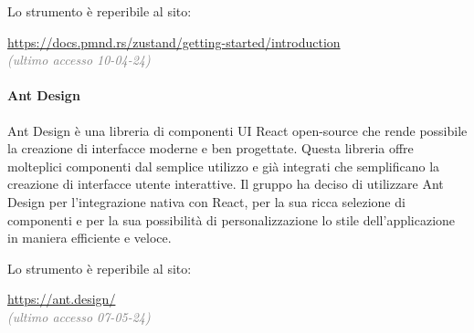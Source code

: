 \noindent Lo strumento è reperibile al sito:
\begin{center}
    \url{https://docs.pmnd.rs/zustand/getting-started/introduction}\\ \textcolor{gray}{\textit{(ultimo accesso 10-04-24)}}
\end{center}

\paragraph{Ant Design} \label{sec:processi_primari:sviluppo:strumenti:ant_design}
Ant Design è una libreria di componenti UI React open-source che rende possibile la creazione di interfacce moderne e ben progettate. Questa libreria offre molteplici componenti dal semplice utilizzo e già integrati che semplificano la creazione di interfacce utente interattive.
Il gruppo ha deciso di utilizzare Ant Design per l'integrazione nativa con React, per la sua ricca selezione di componenti e per la sua possibilità di personalizzazione lo stile dell'applicazione in maniera efficiente e veloce.
 
\noindent Lo strumento è reperibile al sito:
\begin{center}
    \url{https://ant.design/}\\ \textcolor{gray}{\textit{(ultimo accesso 07-05-24)}}
\end{center}

